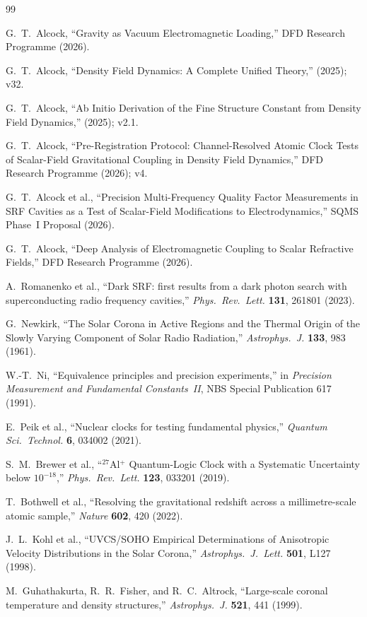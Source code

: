 \documentclass[11pt]{article}
\begin{document}
\begin{thebibliography}{99}

G.~T.~Alcock,
``Gravity as Vacuum Electromagnetic Loading,''
DFD Research Programme (2026).

G.~T.~Alcock,
``Density Field Dynamics: A Complete Unified Theory,''
(2025); v32.

G.~T.~Alcock,
``Ab Initio Derivation of the Fine Structure Constant
from Density Field Dynamics,''
(2025); v2.1.

G.~T.~Alcock,
``Pre-Registration Protocol: Channel-Resolved Atomic Clock Tests
of Scalar-Field Gravitational Coupling in Density Field Dynamics,''
DFD Research Programme (2026); v4.

G.~T.~Alcock et al.,
``Precision Multi-Frequency Quality Factor Measurements in SRF
Cavities as a Test of Scalar-Field Modifications to Electrodynamics,''
SQMS Phase~I Proposal (2026).

G.~T.~Alcock,
``Deep Analysis of Electromagnetic Coupling to Scalar Refractive Fields,''
DFD Research Programme (2026).

A.~Romanenko et al.,
``Dark SRF: first results from a dark photon search with
superconducting radio frequency cavities,''
\textit{Phys.\ Rev.\ Lett.} \textbf{131}, 261801 (2023).

G.~Newkirk,
``The Solar Corona in Active Regions and the Thermal Origin of the
Slowly Varying Component of Solar Radio Radiation,''
\textit{Astrophys.\ J.} \textbf{133}, 983 (1961).

W.-T.~Ni,
``Equivalence principles and precision experiments,''
in \textit{Precision Measurement and Fundamental Constants~II},
NBS Special Publication 617 (1991).

E.~Peik et al.,
``Nuclear clocks for testing fundamental physics,''
\textit{Quantum Sci.\ Technol.} \textbf{6}, 034002 (2021).

S.~M.~Brewer et al.,
``$^{27}$Al$^+$ Quantum-Logic Clock with a Systematic Uncertainty
below $10^{-18}$,''
\textit{Phys.\ Rev.\ Lett.} \textbf{123}, 033201 (2019).

T.~Bothwell et al.,
``Resolving the gravitational redshift across a millimetre-scale
atomic sample,''
\textit{Nature} \textbf{602}, 420 (2022).

J.~L.~Kohl et al.,
``UVCS/SOHO Empirical Determinations of Anisotropic Velocity
Distributions in the Solar Corona,''
\textit{Astrophys.\ J.\ Lett.} \textbf{501}, L127 (1998).

M.~Guhathakurta, R.~R.~Fisher, and R.~C.~Altrock,
``Large-scale coronal temperature and density structures,''
\textit{Astrophys.\ J.} \textbf{521}, 441 (1999).

\end{thebibliography}
\end{document}
